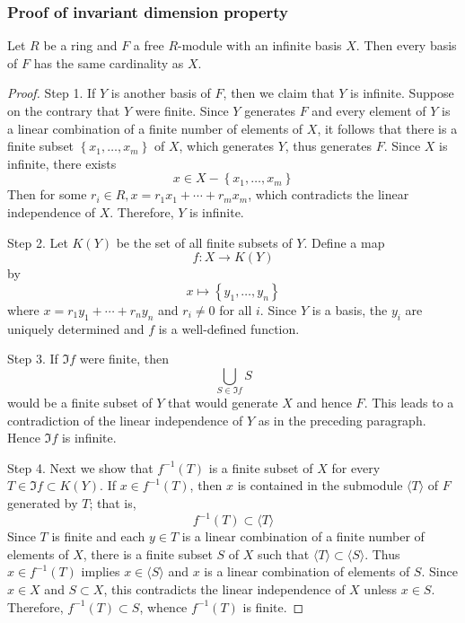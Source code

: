\subsubsection{Proof of invariant dimension property}
\begin{theorem}
    Let $R$ be a ring and $F$ a free $R$-module with an infinite basis $X$.
    Then every basis of $F$ has the same cardinality as $X$.
    \begin{proof}
        Step 1.
        If $Y$ is another basis of $F$, then we claim that $Y$ is infinite. Suppose on the contrary that $Y$ were finite. Since $Y$ generates $F$ and every element of $Y$ is a linear combination of a finite number of elements of $X$, it follows that there is a finite subset
        $\left\{x_1, \ldots, x_m\right\}$ of $X$, which generates $Y$, thus generates $F$.
        Since $X$ is infinite, there exists
        \begin{equation*}
            x \in X-\left\{x_1, \ldots, x_m\right\}
        \end{equation*}
        Then for some $r_i \in R, x=r_1 x_1+\cdots+r_m x_m$, which contradicts the linear independence of $X$. Therefore, $Y$ is infinite.

        Step 2.
        Let $K(Y)$ be the set of all finite subsets of $Y$. Define a map
        \begin{equation*}
            f: X \rightarrow K(Y)
        \end{equation*}
        by
        \begin{equation*}
            x \mapsto\left\{y_1, \ldots, y_n\right\}
        \end{equation*}
        where $x=r_1 y_1+\cdots+r_n y_n$ and $r_i \neq 0$ for all $i$.
        Since $Y$ is a basis, the $y_i$ are uniquely determined and $f$ is a well-defined function.

        Step 3.
        If $\Im f$ were finite, then
        \begin{equation*}
            \bigcup_{S \in \Im f} S
        \end{equation*}
        would be a finite subset of $Y$ that would generate $X$ and hence $F$. This leads to a contradiction of the linear independence of $Y$ as in the preceding paragraph. Hence $\Im f$ is infinite.

        Step 4.
        Next we show that $f^{-1}(T)$ is a finite subset of $X$ for every $T \in \Im f \subset K(Y)$.
        If $x \in f^{-1}(T)$, then $x$ is contained in the submodule $\langle T\rangle$ of $F$ generated by $T$; that is,
        \begin{equation*}
            f^{-1}(T) \subset \langle T\rangle
        \end{equation*}
        Since $T$ is finite and each $y \in T$ is a linear combination of a finite number of elements of $X$, there is a finite subset $S$ of $X$ such that $\langle T\rangle\subset \langle S\rangle$.
        Thus $x \in f^{-1}(T)$ implies $x \in \langle S\rangle$ and $x$ is a linear combination of elements of $S$.
        Since $x \in X$ and $S \subset X$, this contradicts the linear independence of $X$ unless $x \in S$. Therefore, $f^{-1}(T) \subset S$, whence $f^{-1}(T)$ is finite.


\end{proof}
\end{theorem}

